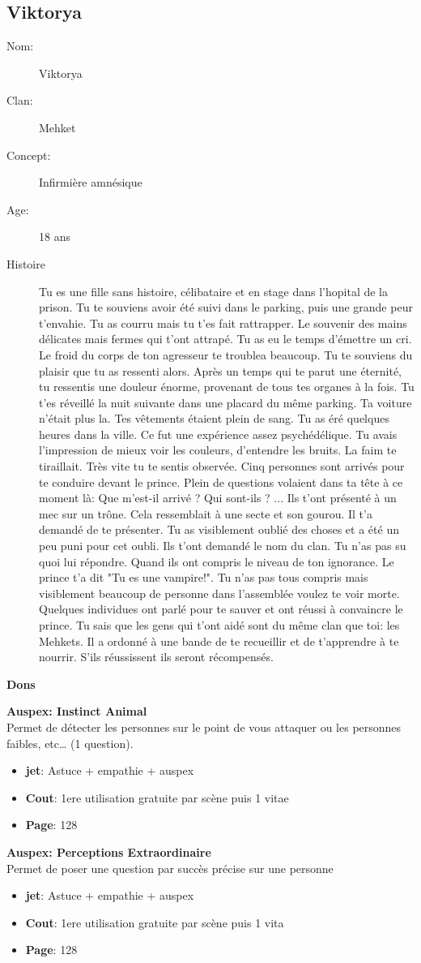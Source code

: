 \documentclass[oneside,12pt]{book}
\newcommand\don[5]{
\textbf{#1} \\
#2
\begin{itemize}
\item{ \textbf{jet}: #3}
\item{ \textbf{Cout}: #4}
\item{ \textbf{Page}: #5}
\end{itemize}
\vspace{0.5cm}
}
\begin{document}
\begin{flushleft}
\section{Viktorya}
\begin{description}
\item[Nom:]{Viktorya}
\item[Clan:]{Mehket}
\item[Concept:]{Infirmière amnésique}
\item[Age:]{18 ans}
\item[Histoire]{
Tu es une fille sans histoire, célibataire et en stage dans l'hopital de la prison. Tu te souviens avoir été suivi dans le parking, puis une grande peur t'envahie. Tu as courru mais tu t'es fait rattrapper.
Le souvenir des mains délicates mais fermes qui t'ont attrapé. Tu as eu le temps d'émettre un cri.
Le froid du corps de ton agresseur te troublea beaucoup. Tu te souviens du plaisir que tu as ressenti alors.
Après un temps qui te parut une éternité, tu ressentis une douleur énorme, provenant de tous tes organes à la fois.
Tu t'es réveillé la nuit suivante dans une placard du même parking.
Ta voiture n'était plus la. Tes vêtements étaient plein de sang.
Tu as éré quelques heures dans la ville. Ce fut une expérience assez psychédélique.
Tu avais l'impression de mieux voir les couleurs, d'entendre les bruits. La faim te tiraillait.
Très vite tu te sentis observée. Cinq personnes sont arrivés pour te conduire devant le prince.
Plein de questions volaient dans ta tête à ce moment là: Que m'est-il arrivé ? Qui sont-ils ? ...
Ils t'ont présenté à un mec sur un trône. Cela ressemblait à une secte et son gourou.
Il t'a demandé de te présenter.
Tu as visiblement oublié des choses et a été un peu puni pour cet oubli. Ils t'ont demandé le nom du clan.
Tu n'as pas su quoi lui répondre.
Quand ils ont compris le niveau de ton ignorance. Le prince t'a dit "Tu es une vampire!".
Tu n'as pas tous compris mais visiblement beaucoup de personne dans l'assemblée voulez te voir morte.
Quelques individues ont parlé pour te sauver et ont réussi à convaincre le prince.
Tu sais que les gens qui t'ont aidé sont du même clan que toi: les Mehkets.
Il a ordonné à une bande de te recueillir et de t'apprendre à te nourrir. S'ils réussissent ils seront récompensés.
}
\end{description}
 
\clearpage
\textbf{\large Dons}
\vspace{0.5cm}

\don{Auspex: Instinct Animal}{Permet de détecter les personnes sur le point de vous attaquer ou les personnes faibles, etc… (1 question).}{Astuce + empathie + auspex}{1ere utilisation gratuite par scène puis 1 vitae}{128}
\don{Auspex: Perceptions Extraordinaire}{Permet de poser une question par succès précise sur une personne}{Astuce + empathie + auspex}{1ere utilisation gratuite par scène puis 1 vita}{128}



\end{flushleft}
\end{document}
